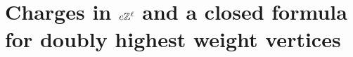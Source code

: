 \documentclass[12pt]{amsart}
\numberwithin{equation}{section}
\theoremstyle{definition}
\begin{document}








\section{Charges in $e\mathbb{Z}^\ell$ and a closed formula for doubly highest weight vertices} \label{widthe}
\end{document}
